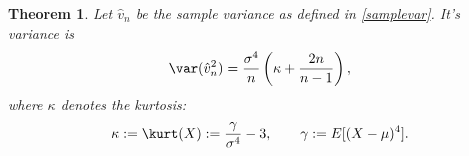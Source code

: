 \documentclass[12pt]{amsart}
\newcommand{\hv}{\hat{v}}
\newtheorem{theorem}{Theorem}
\begin{document}
\begin{theorem} \label{Varvarthm} Let $\hv_n$ be the sample variance as defined in \eqref{samplevar}.  It's variance is
\[
\var(\hv_n^2) = \frac{\sigma^4}{n} \left ( \kappa  + \frac{2n}{n-1}\right),
\]
where $\kappa$ denotes the \emph{kurtosis}:
\begin{equation} \label{kurtdef}
\kappa := \kurt(X) := \frac{\gamma}{\sigma^4} -3 , \qquad \gamma := E[(X-\mu)^4].
\end{equation}
\end{theorem}



\end{document}
